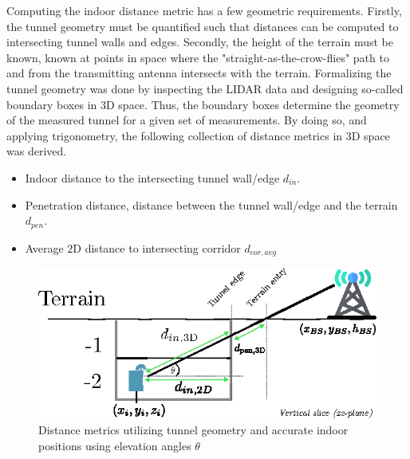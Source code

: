 Computing the indoor distance metric has a few geometric requirements. Firstly, the tunnel geometry must be quantified such that distances can be computed to intersecting tunnel walls and edges. Secondly, the height of the terrain must be known, known at points in space where the "straight-as-the-crow-flies" path to and from the transmitting antenna intersects with the terrain. Formalizing the tunnel geometry was done by inspecting the LIDAR data and designing so-called boundary boxes in $3$D space. Thus, the boundary boxes determine the geometry of the measured tunnel for a given set of measurements. By doing so, and applying trigonometry, the following collection of distance metrics in $3$D space was derived.

\begin{itemize}
    \item Indoor distance to the intersecting tunnel wall/edge $d_{in}$.
    \item Penetration distance, distance between the tunnel wall/edge and the terrain $d_{pen}$.
    \item Average $2$D distance to intersecting corridor $d_{cor,avg}$
\end{itemize}


\begin{figure}
    \centering
    \includegraphics{chapters/part_pathloss/figures/outdoor_to_indoor/inside_distance_illustration.eps}
    \caption{Distance metrics utilizing tunnel geometry and accurate indoor positions using elevation angles $\theta$}
    \label{fig:inside_distance_xz}
\end{figure}

